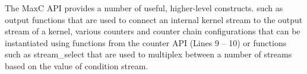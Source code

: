 The MaxC API provides a number of useful, higher-level constructs.
such as output functions that are used to connect an internal kernel
stream to the output stream of a kernel, various counters and counter
chain configurations that can be instantiated using functions from the
counter API (Lines 9 -- 10) or functions such as stream\_select that
are used to multiplex between a number of streams based on the value
of condition stream.


\begin{comment}
\subsection{Designs}

MaxC also allows specification of designs using multiple kernels. This
involves selecting the kernel instances and connecting them as well as
setting a number of design configuration and compilation options such
as operating frequency.

Figure \ref{lst:maxc-design} illustrates the design for the 1D
convolution example which places and connects memory command kernels
to control the generation of memory streams and the actual computation
kernels.

On Lines 3-6 we specify the kernel instances. On Lines 8 -- 10 we
connect these. Lines 13 -- 15 specify the design frequency, the memory
clock frequency and enable the addition of debug elements.

\begin{figure}[!h]
  \centering
  \begin{lstlisting}
    void design_Convolution1D() {
      // kernels
      kernel_t k1 = kernel_init(kernel_Convolution1D);
      kernel_t k2 = kernel_init(kernel_Cmdwrite);
      kernel_t k3 = kernel_init(kernel_Cmdread);

      // connections
      connect2(k1, k2);
      connect3(k1, k2, ``a'');
      connect4(k1, k3, ``a'', ``b'');

      // configuration
      set_frequency(150);
      set_memory_frequency(333);
      set_enable_debug(true);
    }
  \end{lstlisting}
  \caption{MaxC design specification, connecting multiple kernels and
    setting various configuration options}
  \label{lst:maxc-design}
\end{figure}
\end{comment}

